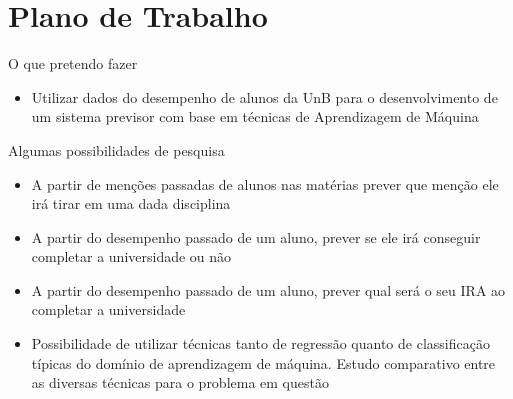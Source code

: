 \section{Plano de Trabalho}
\begin{frame}{O que pretendo fazer}
    \begin{itemize}[itemsep = 5em]
            \item Utilizar dados do desempenho de alunos da UnB para o 
                desenvolvimento de um sistema previsor com base em técnicas 
                de Aprendizagem de Máquina
    \end{itemize}
\end{frame}

\begin{frame}{Algumas possibilidades de pesquisa}
    \begin{itemize}[itemsep = 1.5em]
            \item A partir de menções passadas de alunos nas matérias 
                prever que menção ele irá tirar em uma dada disciplina
            \item A partir do desempenho passado de um aluno, prever 
                se ele irá conseguir completar a universidade ou não
            \item A partir do desempenho passado de um aluno, prever 
                qual será o seu IRA ao completar a universidade
            \item Possibilidade de utilizar técnicas tanto de regressão 
                quanto de classificação típicas do domínio de aprendizagem 
                de máquina. Estudo comparativo entre as diversas técnicas 
                para o problema em questão
    \end{itemize}
\end{frame}
